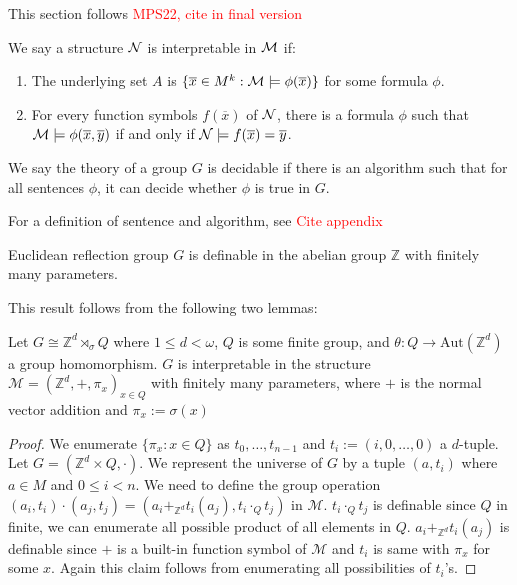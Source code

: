 \documentclass[../main.tex]{subfiles}
\begin{document}
This section follows \textcolor{red}{MPS22, cite in final version}

\begin{definition}
    We say a structure $\mathcal{N}$ is interpretable in $\mathcal{M}$ if:\begin{enumerate}
        \item The underlying set $A$ is $\{\overline x \in M^k:\mathcal{M}\models \phi(\overline x)\}$ for some formula $\phi$.
        \item For every function symbols $f(\overline x)$ of $\mathcal{N}$, there is a formula $\phi$ such that $\mathcal{M} \models \phi(\overline x,\overline y)$ if and only if $\mathcal{N} \models f(\overline x)=\overline y$.
    \end{enumerate}
\end{definition}

\begin{definition}
    We say the theory of a group $G$ is decidable if there is an algorithm such that for all sentences $\phi$, it can decide whether $\phi$ is true in $G$.
\end{definition}

For a definition of sentence and algorithm, see \textcolor{red}{Cite appendix}

\begin{proposition}
\label{thm:interp}
    Euclidean reflection group $G$ is definable in the abelian group $\mathbb Z$ with finitely many parameters.
\end{proposition}

This result follows from the following two lemmas:

\begin{lemma}
    Let $G \cong \mathbb Z^d \rtimes_{\sigma} Q$ where $1\leq d < \omega$, $Q$ is some finite group, and $\theta : Q \rightarrow \text{Aut}(\mathbb Z^d)$ a group homomorphism. $G$ is interpretable in the structure $\mathcal M = (\mathbb Z^d, +, \pi_x)_{x \in Q}$ with finitely many parameters, where $+$ is the normal vector addition and $\pi_x := \sigma(x)$
\end{lemma}

\begin{proof}
    We enumerate $\{\pi_x : x\in Q\}$ as $t_0,\dots,t_{n-1}$ and $t_i := (i,0,\dots,0)$ a $d$-tuple. Let $G=(\mathbb Z^d \times Q,\cdot)$. We represent the universe of $G$ by a tuple $(a,t_i)$ where $a\in M$ and $0\leq i < n$. We need to define the group operation $(a_i,t_i)\cdot(a_j,t_j)=(a_i +_{\mathbb Z^d} t_i(a_j), t_i \cdot_Q t_j)$ in $\mathcal M$. $t_i \cdot_Q t_j$ is definable since $Q$ in finite, we can enumerate all possible product of all elements in $Q$. $a_i +_{\mathbb Z^d} t_i(a_j)$ is definable since $+$ is a built-in function symbol of $\mathcal M$ and $t_i$ is same with $\pi_x$ for some $x$. Again this claim follows from enumerating all possibilities of $t_i$'s.
\end{proof}
\end{document}

